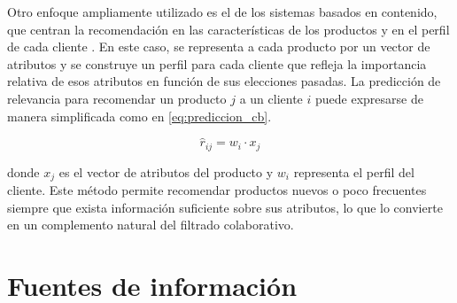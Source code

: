 Otro enfoque ampliamente utilizado es el de los sistemas basados en contenido, que centran la recomendación en las características de los productos y en el perfil de cada cliente \cite{ARTICLE:Pazzani2007}. En este caso, se representa a cada producto por un vector de atributos y se construye un perfil para cada cliente que refleja la importancia relativa de esos atributos en función de sus elecciones pasadas. La predicción de relevancia para recomendar un producto $j$ a un cliente $i$ puede expresarse de manera simplificada como en \ref{eq:prediccion_cb}.

\begin{equation}
\label{eq:prediccion_cb}
\hat{r}_{ij} = w_i \cdot x_j
\end{equation}

donde $x_j$ es el vector de atributos del producto y $w_i$ representa el perfil del cliente. Este método permite recomendar productos nuevos o poco frecuentes siempre que exista información suficiente sobre sus atributos, lo que lo convierte en un complemento natural del filtrado colaborativo.


\section{Fuentes de información}




